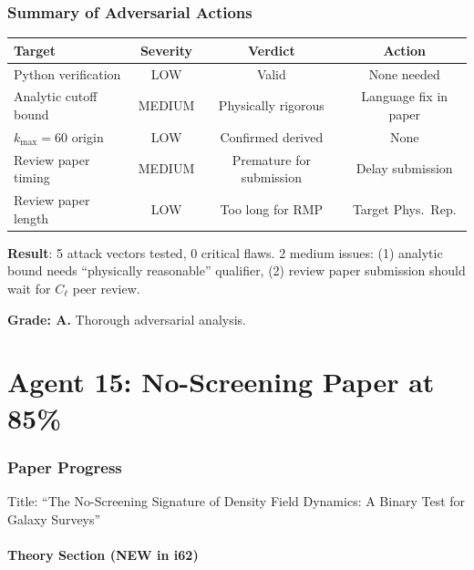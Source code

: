 \documentclass[11pt,a4paper]{article}
\begin{document}
\section{Summary of Adversarial Actions}

\begin{center}
\begin{tabular}{lccc}
\toprule
\textbf{Target} & \textbf{Severity} & \textbf{Verdict} & \textbf{Action} \\
\midrule
Python verification & LOW & Valid & None needed \\
Analytic cutoff bound & MEDIUM & Physically rigorous & Language fix in paper \\
$k_{\max} = 60$ origin & LOW & Confirmed derived & None \\
Review paper timing & MEDIUM & Premature for submission & Delay submission \\
Review paper length & LOW & Too long for RMP & Target Phys.\ Rep. \\
\bottomrule
\end{tabular}
\end{center}

\begin{tcolorbox}[colback=green!5!white, colframe=green!60!black, title={Agent 14: No Critical Flaws}]
\textbf{Result}: 5 attack vectors tested, 0 critical flaws. 2 medium issues: (1) analytic bound needs ``physically reasonable'' qualifier, (2) review paper submission should wait for $C_\ell$ peer review.

\textbf{Grade: A.} Thorough adversarial analysis.
\end{tcolorbox}


\part{Agent 15: No-Screening Paper at 85\%}
\label{part:no-screening}

\section{Paper Progress}

Title: ``The No-Screening Signature of Density Field Dynamics: A Binary Test for Galaxy Surveys''

\subsection{Theory Section (NEW in i62)}
\end{document}
